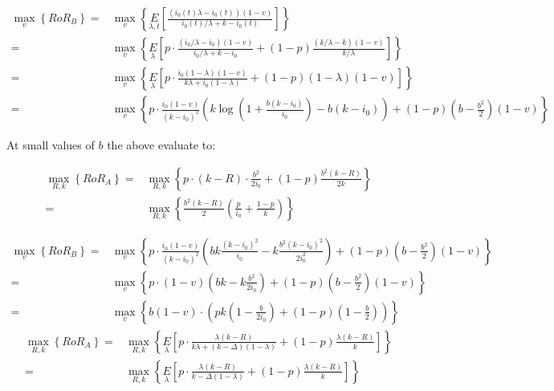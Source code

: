 \begin{align*}
\underset{v}\max\left\{RoR_B\right\} =& \underset{v}\max\left\{\underset{\lambda, t}E\left[\frac{(i_0(t)\lambda - i_0(t))(1-v)}{i_0(t)/\lambda + k - i_0(t)}\right]\right\}\\
                                     =& \underset{v}\max\left\{\underset{\lambda}E\left[p\cdot\frac{(i_0/\lambda - i_0)(1-v)}{i_0/\lambda + k - i_0} + (1-p)\frac{(k/\lambda - k)(1-v)}{k/\lambda}\right]\right\}\\
                                     =& \underset{v}\max\left\{\underset{\lambda}E\left[p\cdot\frac{i_0(1-\lambda)(1-v)}{k\lambda + i_0(1-\lambda)} + (1-p)(1-\lambda)(1-v)\right]\right\}\\
                                     =& \underset{v}\max\left\{p\cdot\frac{i_0(1-v)}{(k-i_0)^2}\left(k\log\left(1+\frac{b(k-i_0)}{i_0}\right) - b(k-i_0)\right) + (1-p)(b-\frac{b^2}{2})(1-v)\right\}
\end{align*}

At small values of $b$ the above evaluate to:

\begin{align*}
\underset{R,k}\max\left\{RoR_A\right\} =& \underset{R,k}\max\left\{p\cdot(k-R)\cdot\frac{b^2}{2i_0} + (1-p)\frac{b^2(k-R)}{2k}\right\}\\
                                       =& \underset{R,k}\max\left\{\frac{b^2(k-R)}{2}\left(\frac{p}{i_0} + \frac{1-p}{k}\right)\right\}
\end{align*}

\begin{align*}
\underset{v}\max\left\{RoR_B\right\} =& \underset{v}\max\left\{p\cdot\frac{i_0(1-v)}{(k-i_0)^2}\left(bk\frac{(k-i_0)^2}{i_0}- k\frac{b^2(k-i_0)^2}{2i_0^2} \right) + (1-p)(b-\frac{b^2}{2})(1-v)\right\}\\
                                     =& \underset{v}\max\left\{p\cdot(1-v)\left(bk- k\frac{b^2}{2i_0}\right) + (1-p)(b-\frac{b^2}{2})(1-v)\right\}\\
                                     =& \underset{v}\max\left\{b(1-v)\cdot \left(pk(1-\frac{b}{2i_0}) + (1-p)(1-\frac{b}{2})\right)\right\}
\end{align*}
\begin{align*}
\underset{R,k}\max\left\{RoR_A\right\} =& \underset{R,k}\max\left\{\underset{\lambda}E\left[p\cdot\frac{\lambda(k-R)}{k\lambda + (k-\Delta)(1-\lambda)} + (1-p)\frac{\lambda(k-R)}{k}\right]\right\}\\
                                       =& \underset{R,k}\max\left\{\underset{\lambda}E\left[p\cdot\frac{\lambda(k-R)}{k - \Delta(1-\lambda)} + (1-p)\frac{\lambda(k-R)}{k}\right]\right\}
\end{align*} 


